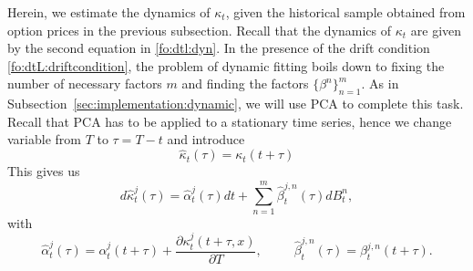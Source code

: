 \documentclass{article}
\numberwithin{equation}{section}
\begin{document}
Herein, we estimate the dynamics of $\kappa_t$, given the historical sample obtained from option prices in the previous subsection. Recall that the dynamics of $\kappa_t$ are given by the second equation in \eqref{fo:dtl:dyn}.
In the presence of the drift condition \eqref{fo:dtL:driftcondition}, the problem of dynamic fitting boils down to fixing the number of necessary factors $m$ and finding the factors $\{\beta^n\}_{n=1}^m$. As in Subsection~\ref{sec:implementation:dynamic}, we will use PCA to complete this task. Recall that PCA has to be applied to a stationary time series, hence we change variable from $T$ to $\tau = T-t$ and introduce 
\begin{equation*}\label{eq.dtl.hkappa.def}
\hat{\kappa}_t(\tau) = \kappa_t(t+\tau)
\end{equation*}
This gives us
\begin{equation}\label{fo:dtL:kappaDynamicsTau}
d\hat{\kappa}_{t}^j(\tau) = \hat{\alpha}^j_t(\tau) dt + \sum_{n=1}^m \hat{\beta}^{j,n}_t(\tau) dB_t^n,
\end{equation} 
with
\begin{equation}\label{eq.dtl.halpha.hbeta.def}
\hat{\alpha}^j_t(\tau) = \alpha^j_t(t+\tau) + \frac{\partial \kappa^j_t(t+\tau,x)}{\partial T}, 
\,\,\,\,\,\,\,\,\,\,\,\,\,\,\,\hat{\beta}^{j,n}_t(\tau) =  \beta^{j,n}_t(t+\tau).
\end{equation}
\end{document}
